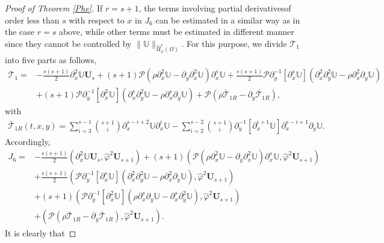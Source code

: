 \documentclass{amsart}
\numberwithin{equation}{section}
\begin{document}
\begin{proof}[Proof of Theorem \ref{Phe}]
If $r=s+1$, the terms involving partial derivativesof order less than $s$ with respect to $x$ in $J_{6}$ can be estimated in a similar way as in the case $r=s$ above, while other terms must be estimated in different manner since they cannot be controlled by $\|\mathbb{U}\|_{\hat{H}_{\psi}^{s}(\Omega)}$. For this purpose, we divide $\mathcal{T}_{1}$ into five parts as follows,
\begin{align*}
\mathcal{T}_{1}
=&-\frac{s(s+1)}{2}\partial_{x}^{2}\mathbb{U}\mathbf{U}_{s}
  +(s+1)\mathcal{P}\left(\rho\partial_{x}^{2}\mathbb{U}-\partial_{y}\partial_{x}^{2}\mathbb{U}\right)\partial_{x}^{s}\mathbb{U}
  +\frac{s(s+1)}{2}\mathcal{P}\partial_{y}^{-1}[\partial_{x}^{s}\mathbb{U}](\partial_{x}^{2}\partial_{y}^{2}\mathbb{U}-\rho\partial_{x}^{2}\partial_{y}\mathbb{U})\\
 &+(s+1)\mathcal{P}\partial_{y}^{-1}[\partial_{x}^{2}\mathbb{U}](\partial_{x}^{s}\partial_{y}^{2}\mathbb{U}-\rho\partial_{x}^{s}\partial_{y}\mathbb{U})
  +\mathcal{P}(\rho\bar{\mathcal{T}}_{1R}-\partial_{y}\bar{\mathcal{T}}_{1R}),
\end{align*}
with
\begin{align*}
\bar{\mathcal{T}}_{1R}(t,x,y)=
 \sum_{i=3}^{s-1}\binom{s+1}{i}\partial_{x}^{s-i+2}\mathbb{U}\partial_{x}^{i}\mathbb{U}
-\sum_{i=2}^{s-2}\binom{s+1}{i}\partial_{y}^{-1}[\partial_{x}^{i+1}\mathbb{U}]\partial_{x}^{s-i+1}\partial_{y}\mathbb{U}.
\end{align*}
Accordingly,
\begin{align}\label{J6}
J_{6}
=&-\frac{s(s+1)}{2}\left(\partial_{x}^{2}\mathbb{U}\mathbf{U}_{s},\hat{\varphi}^{2}\mathbf{U}_{s+1}\right)
  +(s+1)\left(\mathcal{P}\left(\rho\partial_{x}^{2}\mathbb{U}-\partial_{y}\partial_{x}^{2}\mathbb{U}\right)\partial_{x}^{s}\mathbb{U},\hat{\varphi}^{2}\mathbf{U}_{s+1}\right)\\
 &+\frac{s(s+1)}{2}\left(\mathcal{P}\partial_{y}^{-1}[\partial_{x}^{s}\mathbb{U}](\partial_{x}^{2}\partial_{y}^{2}\mathbb{U}-\rho\partial_{x}^{2}\partial_{y}\mathbb{U}),\hat{\varphi}^{2}\mathbf{U}_{s+1}\right)\nonumber\\
 &+(s+1)\left(\mathcal{P}\partial_{y}^{-1}[\partial_{x}^{2}\mathbb{U}](\rho\partial_{x}^{s}\partial_{y}\mathbb{U}-\partial_{x}^{s}\partial_{y}^{2}\mathbb{U}),\hat{\varphi}^{2}\mathbf{U}_{s+1}\right)\nonumber\\
 &+\left(\mathcal{P}(\rho\bar{\mathcal{T}}_{1R}-\partial_{y}\bar{\mathcal{T}}_{1R}),\hat{\varphi}^{2}\mathbf{U}_{s+1}\right).\nonumber
\end{align}
It is clearly that

\end{proof}
\end{document}
